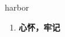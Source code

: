 
\begin{frame}
{\huge harbor}
\begin{center}
\begin{enumerate}\Large
  \item \textbf{心怀，牢记}
\end{enumerate}
\end{center}
\end{frame}
